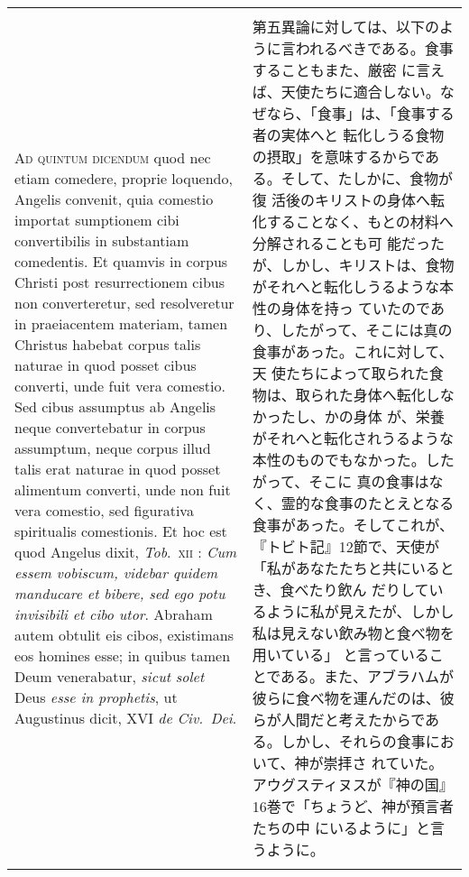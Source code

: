 \documentclass[10pt]{jsarticle} %
\begin{document}
\begin{longtable}{p{21em}p{21em}}
\\\\


{\scshape Ad quintum dicendum} quod nec etiam comedere,
proprie loquendo, Angelis convenit, quia comestio importat sumptionem
cibi convertibilis in substantiam comedentis. Et quamvis in corpus
Christi post resurrectionem cibus non converteretur, sed resolveretur in
praeiacentem materiam, tamen Christus habebat corpus talis naturae in
quod posset cibus converti, unde fuit vera comestio. Sed cibus assumptus
ab Angelis neque convertebatur in corpus assumptum, neque corpus illud
talis erat naturae in quod posset alimentum converti, unde non fuit vera
comestio, sed figurativa spiritualis comestionis. Et hoc est quod
Angelus dixit, {\itshape Tob}.~{\scshape xii} : {\itshape Cum essem vobiscum, videbar quidem manducare et
bibere, sed ego potu invisibili et cibo utor}. Abraham autem obtulit eis
cibos, existimans eos homines esse; in quibus tamen Deum venerabatur,
{\itshape sicut solet} Deus {\itshape esse in prophetis}, ut Augustinus dicit, XVI {\itshape de
Civ.~Dei}.


&

第五異論に対しては、以下のように言われるべきである。食事することもまた、厳密
 に言えば、天使たちに適合しない。なぜなら、「食事」は、「食事する者の実体へと
 転化しうる食物の摂取」を意味するからである。そして、たしかに、食物が復
 活後のキリストの身体へ転化することなく、もとの材料へ分解されることも可
 能だったが、しかし、キリストは、食物がそれへと転化しうるような本性の身体を持っ
 ていたのであり、したがって、そこには真の食事があった。これに対して、天
 使たちによって取られた食物は、取られた身体へ転化しなかったし、かの身体
 が、栄養がそれへと転化されうるような本性のものでもなかった。したがって、そこに
 真の食事はなく、霊的な食事のたとえとなる食事があった。そしてこれが、
 『トビト記』12節で、天使が「私があなたたちと共にいるとき、食べたり飲ん
 だりしているように私が見えたが、しかし私は見えない飲み物と食べ物を用いている」
 と言っていることである。また、アブラハムが彼らに食べ物を運んだのは、彼
 らが人間だと考えたからである。しかし、それらの食事において、神が崇拝さ
 れていた。アウグスティヌスが『神の国』16巻で「ちょうど、神が預言者たちの中
 にいるように」と言うように。

\\\\




\end{longtable}
\end{document}
